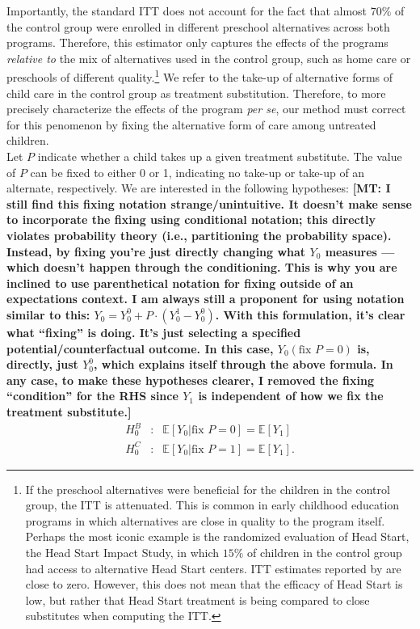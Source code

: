 \noindent Importantly, the standard ITT does not account for the fact that almost $70 \%$ of the control group were enrolled in different preschool alternatives across both programs. Therefore, this estimator only captures the effects of the programs \emph{relative to} the mix of alternatives used in the control group, such as home care or preschools of different quality.\footnote{If the preschool alternatives were beneficial for the children in the control group, the ITT is attenuated. This is common in early childhood education programs in which alternatives are close in quality to the program itself. Perhaps the most iconic example is the randomized evaluation of Head Start, the Head Start Impact Study, in which $15\%$ of children in the control group had access to alternative Head Start centers. ITT estimates reported by \cite{Puma_Bell_etal_2010_HeadStartImpact} are close to zero. However, this does not mean that the efficacy of Head Start is low, but rather that Head Start treatment is being compared to close substitutes when computing the ITT.} We refer to the take-up of alternative forms of child care in the control group as treatment substitution. Therefore, to more precisely characterize the effects of the program \emph{per se}, our method must correct for this penomenon by fixing the alternative form of care among untreated children. \\

\noindent Let $P$ indicate whether a child takes up a given treatment substitute. The value of $P$ can be fixed to either $0$ or 1, indicating no take-up or take-up of an alternate, respectively. We are interested in the following hypotheses: \textbf{[MT: I still find this fixing notation strange/unintuitive. It doesn't make sense to incorporate the fixing using conditional notation; this directly violates probability theory (i.e., partitioning the probability space). Instead, by fixing you're just directly changing what $Y_{0}$ measures --- which doesn't happen through the conditioning. This is why you are inclined to use parenthetical notation for fixing outside of an expectations context. I am always still a proponent for using notation similar to this: $ Y_{0} = Y_{0}^{0} + P \cdot (Y_{0}^{1} - Y_{0}^{0}) $. With this formulation, it's clear what ``fixing'' is doing. It's just selecting a specified potential/counterfactual outcome. In this case, $ Y_{0}(\text{fix }P=0) $ is, directly, just $  Y_{0}^{0} $, which explains itself through the above formula. In any case, to make these hypotheses clearer, I removed the fixing ``condition'' for the RHS since $Y_{1}$ is independent of how we fix the treatment substitute.]}
\begin{eqnarray}
H_{0}^B &:& \mathbb{E} \left[ Y_{0} | \text{fix } P = 0 \right] =  \mathbb{E} \left[ Y_{1}  \right] \label{eq:hoB} \\
H_{0}^C &:&  \mathbb{E} \left[ Y_{0} | \text{fix } P = 1 \right] =  \mathbb{E} \left[ Y_{1}  \right] \label{eq:hoC}. 
\end{eqnarray}

